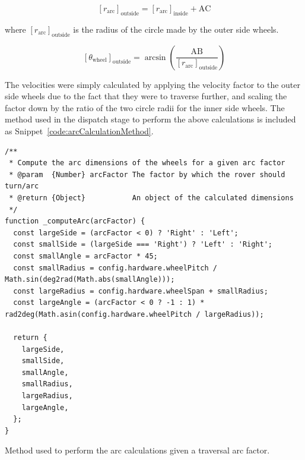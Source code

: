         \begin{equation}
          \label{eq:softDev-outerWheelRadius}
          \left[r_{\text{arc}}\right]_{\text{outside}} = \left[r_{\text{arc}}\right]_{\text{inside}} + \text{AC}
        \end{equation}
        \begin{flushright}
          where $\left[r_{\text{arc}}\right]_{\text{outside}}$ is the radius of the circle made by the outer side wheels.
        \end{flushright}
         
        \begin{equation}
          \label{eq:softDev-outerWheelAngle}
          \left[\theta_{\text{wheel}}\right]_{\text{outside}} = \arcsin\left(\frac{\text{AB}}{\left[r_{\text{arc}}\right]_{\text{outside}}}\right)
        \end{equation}
        
        The velocities were simply calculated by applying the velocity factor to the outer side wheels due to the fact that they were to traverse further, and scaling the factor down by the ratio of the two circle radii for the inner side wheels. The method used in the dispatch stage to perform the above calculations is included as Snippet~\ref{code:arcCalculationMethod}.
        
        \begin{code}
          \begin{verbatim}
/**
 * Compute the arc dimensions of the wheels for a given arc factor
 * @param  {Number} arcFactor The factor by which the rover should turn/arc
 * @return {Object}           An object of the calculated dimensions
 */
function _computeArc(arcFactor) {
  const largeSide = (arcFactor < 0) ? 'Right' : 'Left';
  const smallSide = (largeSide === 'Right') ? 'Left' : 'Right';
  const smallAngle = arcFactor * 45;
  const smallRadius = config.hardware.wheelPitch / Math.sin(deg2rad(Math.abs(smallAngle)));
  const largeRadius = config.hardware.wheelSpan + smallRadius;
  const largeAngle = (arcFactor < 0 ? -1 : 1) * rad2deg(Math.asin(config.hardware.wheelPitch / largeRadius));

  return {
    largeSide,
    smallSide,
    smallAngle,
    smallRadius,
    largeRadius,
    largeAngle,
  };
}        		
          \end{verbatim}
          \caption{Method used to perform the arc calculations given a traversal arc factor.}
          \label{code:arcCalculationMethod}
        \end{code}
      
